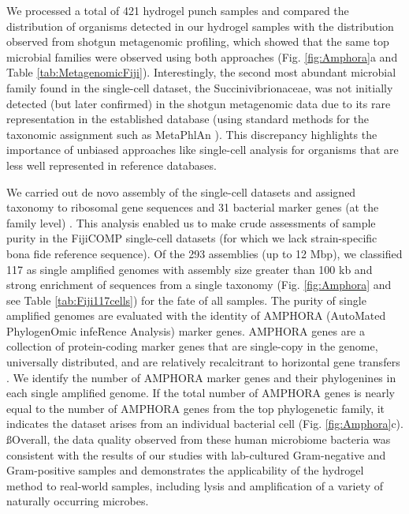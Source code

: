 We processed a total of 421 hydrogel punch samples and compared the distribution of organisms detected in our hydrogel samples with the distribution observed from shotgun metagenomic profiling, which showed that the same top microbial families were observed using both approaches (Fig. \ref{fig:Amphora}a and Table \ref{tab:MetagenomicFiji}). Interestingly, the second most abundant microbial family found in the single-cell dataset, the Succinivibrionaceae, was not initially detected (but later confirmed) in the shotgun metagenomic data due to its rare representation in the established database (using standard methods for the taxonomic assignment such as MetaPhlAn \cite{Segata:2012ts}). This discrepancy highlights the importance of unbiased approaches like single-cell analysis for organisms that are less well represented in reference databases.

We carried out de novo assembly of the single-cell datasets and assigned taxonomy to ribosomal gene sequences and 31  bacterial marker genes (at the family level) \cite{Wu:2012dh}. This analysis enabled us to make crude assessments of sample purity in the FijiCOMP single-cell datasets (for which we lack strain-specific bona fide reference sequence). Of the 293 assemblies (up to 12 Mbp), we classified 117 as single amplified genomes with assembly size greater than 100 kb and strong enrichment of sequences from a single taxonomy (Fig. \ref{fig:Amphora} and see Table \ref{tab:Fiji117cells}) for the fate of all samples. The purity of single amplified genomes are evaluated with the identity of AMPHORA (AutoMated PhylogenOmic infeRence Analysis) marker genes. AMPHORA genes are a collection of protein-coding marker genes that are single-copy in the genome, universally distributed, and are relatively recalcitrant to horizontal gene transfers \cite{Wu:2012dh}. We identify the number of AMPHORA marker genes and their phylogenines in each single amplified genome. If the total number of AMPHORA genes is nearly equal to the number of AMPHORA genes from the top phylogenetic family, it indicates the dataset arises from an individual bacterial cell (Fig. \ref{fig:Amphora}c). ßOverall, the data quality observed from these human microbiome bacteria was consistent with the results of our studies with lab-cultured Gram-negative and Gram-positive samples and demonstrates the applicability of the hydrogel method to real-world samples, including lysis and amplification of a variety of naturally occurring microbes.

